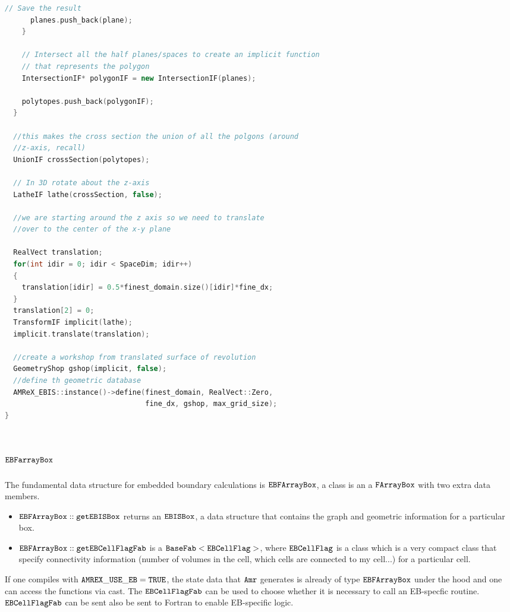 \begin{lstlisting}[language=cpp]
      // Save the result
      planes.push_back(plane);
    }

    // Intersect all the half planes/spaces to create an implicit function
    // that represents the polygon
    IntersectionIF* polygonIF = new IntersectionIF(planes);

    polytopes.push_back(polygonIF);
  }

  //this makes the cross section the union of all the polgons (around
  //z-axis, recall)
  UnionIF crossSection(polytopes);
            
  // In 3D rotate about the z-axis 
  LatheIF lathe(crossSection, false);

  //we are starting around the z axis so we need to translate
  //over to the center of the x-y plane
            
  RealVect translation;
  for(int idir = 0; idir < SpaceDim; idir++)
  {
    translation[idir] = 0.5*finest_domain.size()[idir]*fine_dx;
  }
  translation[2] = 0;
  TransformIF implicit(lathe);
  implicit.translate(translation);

  //create a workshop from translated surface of revolution
  GeometryShop gshop(implicit, false);
  //define th geometric database
  AMReX_EBIS::instance()->define(finest_domain, RealVect::Zero,
                                 fine_dx, gshop, max_grid_size);
}

\end{lstlisting}

\section{$\tt{EBFarrayBox}$}

The fundamental data structure for embedded boundary calculations is 
$\tt{EBFArrayBox}$, a class is an a $\tt{FArrayBox}$ with two extra
data members.
\begin{itemize}
\item $\tt{EBFArrayBox::getEBISBox}$ returns an $\tt{EBISBox}$, a data
  structure that contains the graph and geometric information for a
  particular box.
\item $\tt{EBFArrayBox::getEBCellFlagFab}$  is a
  $\tt{BaseFab<EBCellFlag>}$, where $\tt{EBCellFlag}$ is a class which
  is a very compact class that specify connectivity information
  (number of volumes in the cell, which cells are connected to my
  cell...) for a particular cell.
\end{itemize}
If one compiles with $\tt{AMREX\_USE\_EB = TRUE}$, the state data that
${\tt Amr}$ generates is already of type $\tt{EBFArrayBox}$ under the
hood and one can access the functions via cast.   The
$\tt{EBCellFlagFab}$ can be used to choose whether it is necessary to call an
EB-specfic routine. $\tt{EBCellFlagFab}$  can be sent also be sent to Fortran to 
enable EB-specific logic.   


